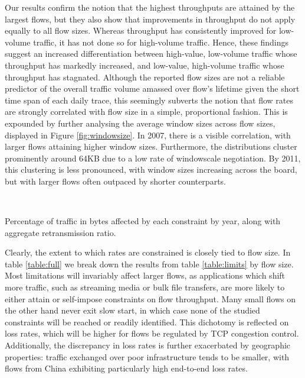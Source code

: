 Our results confirm the notion that the highest throughputs are attained by the largest flows, but they also show that improvements in throughput do not apply equally to all flow sizes. Whereas throughput has consistently improved for low-volume traffic, it has not done so for high-volume traffic. Hence, these findings suggest an increased differentiation between high-value, low-volume traffic whose throughput has markedly increased, and low-value, high-volume traffic whose throughput has stagnated.
Although the reported flow sizes are not a reliable predictor of the overall traffic volume amassed over flow's lifetime given the short time span of each daily trace, this seemingly subverts the notion that flow rates are strongly correlated with flow size in a simple, proportional fashion.  This is expounded by further analysing the average window sizes across flow sizes, displayed in Figure \ref{fig:windowsize}.
In 2007, there is a visible correlation, with larger flows attaining higher window sizes.
Furthermore, the distributions cluster prominently around 64KB due to a low rate of windowscale negotiation.
By 2011, this clustering is less pronounced, with window sizes increasing across the board, but with larger flows often outpaced by shorter counterparts.



\begin{table}\scriptsize
\centering
  \\
\caption{
Percentage of traffic in bytes affected by each constraint by year, along with aggregate retransmission ratio.}
\label{table:full}
\end{table}

Clearly, the extent to which rates are constrained is closely tied to flow size. 
In table \ref{table:full} we break down the results from table \ref{table:limits} by flow size. 
Most limitations will invariably affect larger flows, as applications which shift more traffic, such as streaming media or bulk file transfers, are more likely to either attain or self-impose constraints on flow throughput. 
Many small flows on the other hand never exit slow start, in which case none of the studied constraints will be reached or readily identified. 
This dichotomy is reflected on loss rates, which will be higher for flows be regulated by TCP congestion control.
Additionally, the discrepancy in loss rates is further exacerbated by geographic properties: traffic exchanged over poor infrastructure tends to be smaller, with flows from China exhibiting particularly high end-to-end loss rates. 

